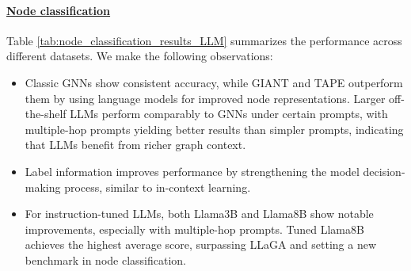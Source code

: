 \paragraph{\underline{Node classification}}



Table \ref{tab:node_classification_results_LLM} summarizes the performance across different datasets. We make the following observations:
\begin{itemize}

\item Classic GNNs show consistent accuracy, while GIANT and TAPE outperform them by using language models for improved node representations. Larger off-the-shelf LLMs perform comparably to GNNs under certain prompts, with multiple-hop prompts yielding better results than simpler prompts, indicating that LLMs benefit from richer graph context.

\item Label information improves performance by strengthening the model decision-making process, similar to in-context learning.

\item For instruction-tuned LLMs, both Llama3B and Llama8B show notable improvements, especially with multiple-hop prompts. Tuned Llama8B achieves the highest average score, surpassing LLaGA and setting a new benchmark in node classification.
\end{itemize}



